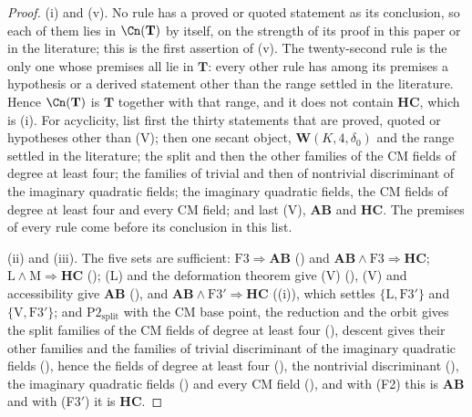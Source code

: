 \begin{proof}
(i) and (v). No rule has a proved or quoted statement as its conclusion, so
each of them lies in $\Cn(\mathbf{T})$ by itself, on the strength of its proof
in this paper or in the literature; this is the first assertion of (v). The
twenty-second rule is the only one whose premises all lie in $\mathbf{T}$:
every other rule has among its premises a hypothesis or a derived statement
other than the range settled in the literature. Hence $\Cn(\mathbf{T})$ is
$\mathbf{T}$ together with that range, and it does not contain $\mathbf{HC}$,
which is (i). For acyclicity, list first the thirty statements that are
proved, quoted or hypotheses other than (V); then one secant object,
$\mathbf{W}(K,4,\delta_{0})$ and the range settled in the literature; the
split and then the other families of the CM fields of degree at least four;
the families of trivial and then of nontrivial discriminant of the imaginary
quadratic fields; the imaginary quadratic fields, the CM fields of degree at
least four and every CM field; and last (V), $\mathbf{AB}$ and $\mathbf{HC}$.
The premises of every rule come before its conclusion in this list.

(ii) and (iii). The five sets are sufficient:
$\mathrm{F3}\Rightarrow\mathbf{AB}$ () and
$\mathbf{AB}\wedge\mathrm{F3}\Rightarrow\mathbf{HC}$; $\mathrm{L}\wedge
\mathrm{M}\Rightarrow\mathbf{HC}$ (); (L) and the
deformation theorem give (V) (), (V) and accessibility give
$\mathbf{AB}$ (), and $\mathbf{AB}\wedge\mathrm{F3}'
\Rightarrow\mathbf{HC}$ ((i)), which settles
$\{\mathrm{L},\mathrm{F3}'\}$ and $\{\mathrm{V},\mathrm{F3}'\}$; and
$\mathrm{P2}_{\mathrm{split}}$ with the CM base point, the reduction and the
orbit gives the split families of the CM fields of degree at least four
(\cite[Theorem~17.7]{paperI}), descent gives their other families and the
families of trivial discriminant of the imaginary quadratic fields
(), hence the fields of degree at least four
(\cite[Proposition~17.3]{paperI}), the nontrivial discriminant (),
the imaginary quadratic fields () and every CM field
(\cite[Appendix~C]{paperI}), and with (F2) this is $\mathbf{AB}$ and with (F3$'$)
it is $\mathbf{HC}$.


\end{proof}
